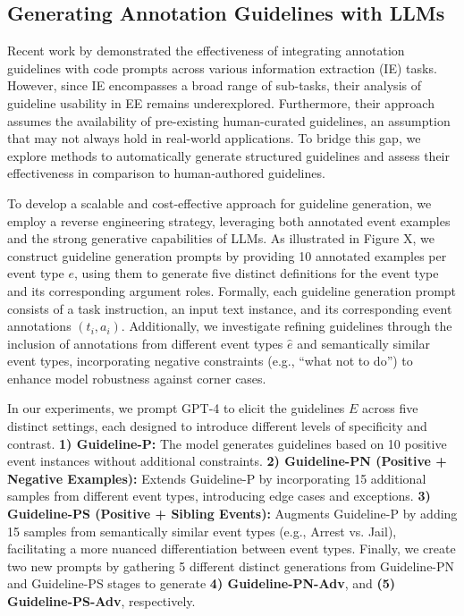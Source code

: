 \subsection{Generating Annotation Guidelines with LLMs}
\label{sec:guideline_generation}

Recent work by \citet{GoLLIE} demonstrated the effectiveness of integrating annotation guidelines with code prompts across various information extraction (IE) tasks. However, since IE encompasses a broad range of sub-tasks, their analysis of guideline usability in EE remains underexplored. Furthermore, their approach assumes the availability of pre-existing human-curated guidelines, an assumption that may not always hold in real-world applications. To bridge this gap, we explore methods to automatically generate structured guidelines and assess their effectiveness in comparison to human-authored guidelines.

To develop a scalable and cost-effective approach for guideline generation, we employ a reverse engineering strategy, leveraging both annotated event examples and the strong generative capabilities of LLMs. As illustrated in Figure X, we construct guideline generation prompts by providing 10 annotated examples per event type $e$, using them to generate five distinct definitions for the event type and its corresponding argument roles. Formally, each guideline generation prompt consists of a task instruction, an input text instance, and its corresponding event annotations $(t_i, a_i)$. Additionally, we investigate refining guidelines through the inclusion of annotations from different event types $\hat{e}$  and semantically similar event types, incorporating negative constraints (e.g., ``what not to do'') to enhance model robustness against corner cases.

In our experiments, we prompt GPT-4 to elicit the guidelines \(E\) across five distinct settings, each designed to introduce different levels of specificity and contrast. \textbf{1) Guideline-P:} The model generates guidelines based on 10 positive event instances without additional constraints.
\textbf{2) Guideline-PN (Positive + Negative Examples):} Extends Guideline-P by incorporating 15 additional samples from different event types, introducing edge cases and exceptions.
\textbf{3) Guideline-PS (Positive + Sibling Events):} Augments Guideline-P by adding 15 samples from semantically similar event types (e.g., Arrest vs. Jail), facilitating a more nuanced differentiation between event types.
Finally, we create two new prompts by gathering 5 different distinct generations from Guideline-PN and Guideline-PS stages to generate \textbf{4) Guideline-PN-Adv}, and \textbf{(5) Guideline-PS-Adv}, respectively.

